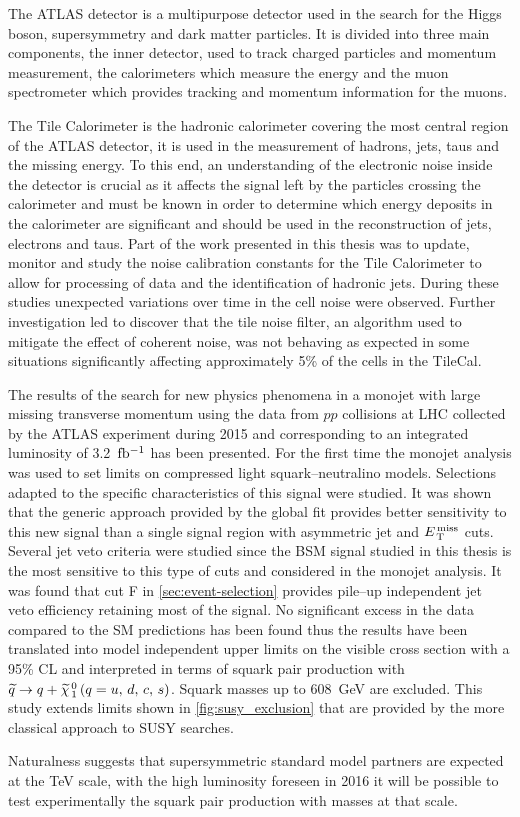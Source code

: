 The ATLAS detector is a multipurpose detector used in the search for the Higgs
boson, supersymmetry and dark matter particles. It is divided into three main
components, the inner detector, used to track charged particles and momentum
measurement, the calorimeters which measure the energy and the muon spectrometer
which provides tracking and momentum information for the muons.

The Tile Calorimeter is the hadronic calorimeter covering the most central
region of the ATLAS detector, it is used in the measurement of hadrons, jets,
taus and the missing energy. To this end, an understanding of the electronic
noise inside the detector is crucial as it affects the signal left by the
particles crossing the calorimeter and must be known in order to determine which
energy deposits in the calorimeter are significant and should be used in the
reconstruction of jets, electrons and taus. Part of the work presented in this
thesis was to update, monitor and study the noise calibration constants for the
Tile Calorimeter to allow for processing of data and the identification of
hadronic jets. During these studies unexpected variations over time in the cell
noise were observed. Further investigation led to discover that the tile noise
filter, an algorithm used to mitigate the effect of coherent noise, was not
behaving as expected in some situations significantly affecting approximately
5\% of the cells in the TileCal.

The results of the search for new physics phenomena in a monojet with large
missing transverse momentum using the data from $pp$ collisions at LHC collected
by the ATLAS experiment during 2015 and corresponding to an integrated
luminosity of 3.2~$\mbox{fb$^{-1}$}$ has been presented. For the first time the monojet
analysis was used to set limits on compressed light squark--neutralino
models. Selections adapted to the specific characteristics of this signal were
studied. It was shown that the generic approach provided by the global fit
provides better sensitivity to this new signal than a single signal region with
asymmetric jet and $E_\mathrm{\, T}^\mathrm{\, miss}$ cuts. Several jet veto criteria were studied since the
BSM signal studied in this thesis is the most sensitive to this type of cuts and
considered in the monojet analysis. It was found that cut F in
\cref{sec:event-selection} provides pile--up independent jet veto efficiency
retaining most of the signal. No significant excess in the data compared to the
SM predictions has been found thus the results have been translated into model
independent upper limits on the visible cross section with a 95\% CL and
interpreted in terms of squark pair production with $\widetilde{q} \rightarrow q + \widetilde{\chi}_{\, 1}^{\, 0}\, (q = u,\, d,\, c,\, s)$. Squark masses
up to 608~GeV are excluded. This study extends limits shown in
\cref{fig:susy_exclusion} that are provided by the more classical approach to
SUSY searches.

Naturalness suggests that supersymmetric standard model partners are expected at
the TeV scale, with the high luminosity foreseen in 2016 it will be possible to
test experimentally the squark pair production with masses at that scale.
